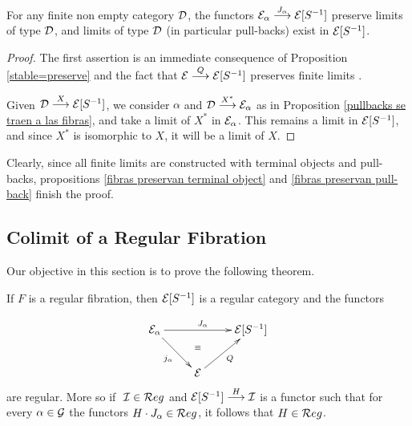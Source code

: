 \begin{proposition} \label{fibras preservan pull-back}
For any finite non empty category $\mathcal{D}$, the functors 
$\mathcal{E}_\alpha \overset {J_\alpha} {\longrightarrow} \mathcal{E}[S^{-1}]$ preserve limits of type      
$\mathcal{D}$, and limits of type $\mathcal{D}$ (in particular pull-backs) exist in 
$\mathcal{E}[S^{-1}]$.    
\end{proposition}
\begin{proof}
The first assertion is an immediate consequence of Proposition 
\ref{stable=preserve} and the fact that $\mathcal{E} \overset {Q} {\longrightarrow} \mathcal{E}[S^{-1}]$ preserves finite limits 
\cite{gabzis}.  

Given $\mathcal{D}  \overset {X} {\longrightarrow} \mathcal{E}[S^{-1}]$, we consider $\alpha$ and  
$\mathcal{D}  \overset {X^*} {\longrightarrow} \mathcal{E}_\alpha$ as in Proposition \ref{pullbacks se traen a las fibras}, and take a limit of $X^*$ in $\mathcal{E}_\alpha$. This remains a limit in $\mathcal{E}[S^{-1}]$, and since $X^*$ is isomorphic to $X$, it will be a limit of $X$.
\end{proof}
%
\begin{sinnadastandard} 
\end{sinnadastandard}   
Clearly, since all finite limits are constructed with terminal objects and pull-backs, propositions \ref{fibras preservan terminal object} and 
\ref{fibras preservan pull-back} finish the proof. \cqd



\subsection{Colimit of a Regular Fibration}

Our objective in this section is to prove the following theorem.


\begin{theorem}\label{colimit of regular fibrations is regular}
If $F$ is a regular fibration, then $\mathcal{E}[S^{-1}]$ is a regular category and the functors

\[
\xymatrix{\cc{E}_\alpha  \ar[dr]_{j_\alpha} \ar[rr]^{J_\alpha} & & \cc{E}[S^{-1}]\\ 
		       & \cc{E} \ar[ur]_Q \ar@{}[u]|(.6)\equiv  }		
\]
\noindent are regular. More so if $\ \mathcal{I} \in \mathcal{R}eg$ and ${\mathcal{E}[S^{-1}] \overset {H} {\longrightarrow} \mathcal{I}}$ is a functor such that for every ${\alpha \in \mathcal{G}}$ the functors $H \cdot J_\alpha \in \mathcal{R}eg$, it follows that ${H \in \mathcal{R}eg}$.
\end{theorem}

